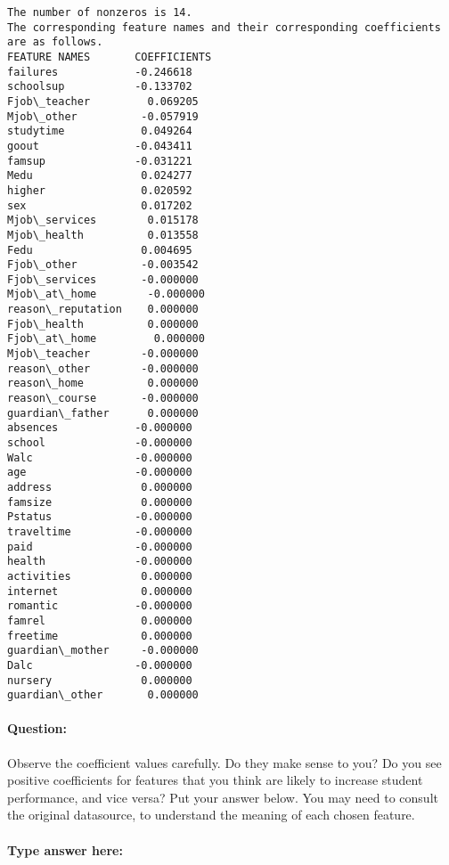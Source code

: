 \documentclass[11pt]{article}
\begin{document}
    \begin{Verbatim}[commandchars=\\\{\}]
The number of nonzeros is 14.
The corresponding feature names and their corresponding coefficients are as follows.
FEATURE NAMES       COEFFICIENTS
failures            -0.246618
schoolsup           -0.133702
Fjob\_teacher         0.069205
Mjob\_other          -0.057919
studytime            0.049264
goout               -0.043411
famsup              -0.031221
Medu                 0.024277
higher               0.020592
sex                  0.017202
Mjob\_services        0.015178
Mjob\_health          0.013558
Fedu                 0.004695
Fjob\_other          -0.003542
Fjob\_services       -0.000000
Mjob\_at\_home        -0.000000
reason\_reputation    0.000000
Fjob\_health          0.000000
Fjob\_at\_home         0.000000
Mjob\_teacher        -0.000000
reason\_other        -0.000000
reason\_home          0.000000
reason\_course       -0.000000
guardian\_father      0.000000
absences            -0.000000
school              -0.000000
Walc                -0.000000
age                 -0.000000
address              0.000000
famsize              0.000000
Pstatus             -0.000000
traveltime          -0.000000
paid                -0.000000
health              -0.000000
activities           0.000000
internet             0.000000
romantic            -0.000000
famrel               0.000000
freetime             0.000000
guardian\_mother     -0.000000
Dalc                -0.000000
nursery              0.000000
guardian\_other       0.000000

    \end{Verbatim}

    \hypertarget{question}{%
\paragraph{Question:}\label{question}}

Observe the coefficient values carefully. Do they make sense to you? Do
you see positive coefficients for features that you think are likely to
increase student performance, and vice versa? Put your answer below. You
may need to consult the original datasource, to understand the meaning
of each chosen feature.

    \hypertarget{type-answer-here}{%
\paragraph{Type answer here:}\label{type-answer-here}}
\end{document}
